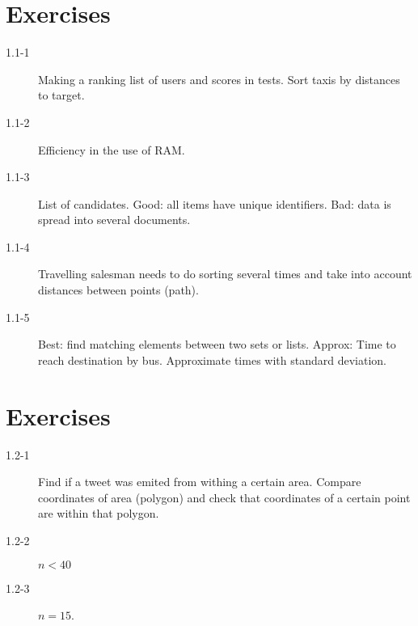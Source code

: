 \section*{Exercises}

\begin{description}
 \item[1.1-1] Making a ranking list of users and scores in tests. Sort taxis by distances to target.
 \item[1.1-2] Efficiency in the use of RAM.
 \item[1.1-3] List of candidates. Good: all items have unique identifiers. Bad: data is spread into several documents.
 \item[1.1-4] Travelling salesman needs to do sorting several times and take into account distances between points (path).
 \item[1.1-5] Best: find matching elements between two sets or lists. Approx: Time to reach destination by bus. Approximate times with standard deviation.
\end{description}


\section*{Exercises}

\begin{description}
 \item[1.2-1] Find if a tweet was emited from withing a certain area. Compare
     coordinates of area (polygon) and check that coordinates of a certain
     point are within that polygon.
 \item[1.2-2] $n < 40$
 \item[1.2-3] $n = 15$.
\end{description}
